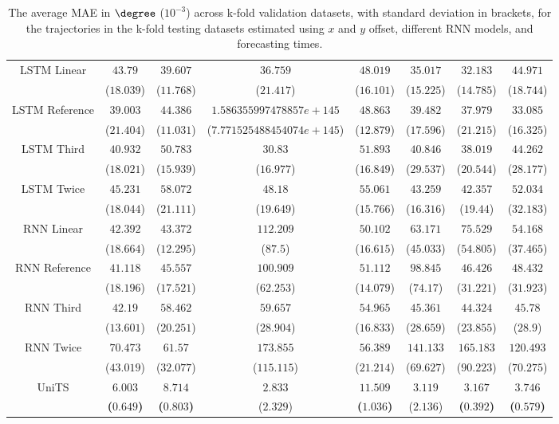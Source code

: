 \begin{table}[!ht]
{\begin{tabular}{|c|c|c|c|c|c|c|c|}
			\multirow{2}{*}{LSTM Linear} & $43.79$ & $39.607$ & $36.759$ & $48.019$ & $35.017$ & $32.183$ & $44.971$ \\
			 & ($18.039$) & ($11.768$) & ($21.417$) & ($16.101$) & ($15.225$) & ($14.785$) & ($18.744$) \\ \hline
			\multirow{2}{*}{LSTM Reference} & $39.003$ & $44.386$ & $1.586355997478857e+145$ & $48.863$ & $39.482$ & $37.979$ & $33.085$ \\
			 & ($21.404$) & ($11.031$) & ($7.771525488454074e+145$) & ($12.879$) & ($17.596$) & ($21.215$) & ($16.325$) \\ \hline
			\multirow{2}{*}{LSTM Third} & $40.932$ & $50.783$ & $30.83$ & $51.893$ & $40.846$ & $38.019$ & $44.262$ \\
			 & ($18.021$) & ($15.939$) & ($16.977$) & ($16.849$) & ($29.537$) & ($20.544$) & ($28.177$) \\ \hline
			\multirow{2}{*}{LSTM Twice} & $45.231$ & $58.072$ & $48.18$ & $55.061$ & $43.259$ & $42.357$ & $52.034$ \\
			 & ($18.044$) & ($21.111$) & ($19.649$) & ($15.766$) & ($16.316$) & ($19.44$) & ($32.183$) \\ \hline
			\multirow{2}{*}{RNN Linear} & $42.392$ & $43.372$ & $112.209$ & $50.102$ & $63.171$ & $75.529$ & $54.168$ \\
			 & ($18.664$) & ($12.295$) & ($87.5$) & ($16.615$) & ($45.033$) & ($54.805$) & ($37.465$) \\ \hline
			\multirow{2}{*}{RNN Reference} & $41.118$ & $45.557$ & $100.909$ & $51.112$ & $98.845$ & $46.426$ & $48.432$ \\
			 & ($18.196$) & ($17.521$) & ($62.253$) & ($14.079$) & ($74.17$) & ($31.221$) & ($31.923$) \\ \hline
			\multirow{2}{*}{RNN Third} & $42.19$ & $58.462$ & $59.657$ & $54.965$ & $45.361$ & $44.324$ & $45.78$ \\
			 & ($13.601$) & ($20.251$) & ($28.904$) & ($16.833$) & ($28.659$) & ($23.855$) & ($28.9$) \\ \hline
			\multirow{2}{*}{RNN Twice} & $70.473$ & $61.57$ & $173.855$ & $56.389$ & $141.133$ & $165.183$ & $120.493$ \\
			 & ($43.019$) & ($32.077$) & ($115.115$) & ($21.214$) & ($69.627$) & ($90.223$) & ($70.275$) \\ \hline
			\multirow{2}{*}{UniTS} & $\mathbf{6.003}$ & $\mathbf{8.714}$ & $2.833$ & $\mathbf{11.509}$ & $3.119$ & $\mathbf{3.167}$ & $\mathbf{3.746}$ \\
			 & \textbf{(}$\mathbf{0.649}$\textbf{)} & \textbf{(}$\mathbf{0.803}$\textbf{)} & ($2.329$) & \textbf{(}$\mathbf{1.036}$\textbf{)} & ($2.136$) & \textbf{(}$\mathbf{0.392}$\textbf{)} & \textbf{(}$\mathbf{0.579}$\textbf{)} \\ \hline
		\end{tabular}
	}
	\caption{The average MAE in $\degree$ ($10^{-3}$) across k-fold validation datasets, with standard deviation in brackets, for the trajectories in the k-fold testing datasets estimated using $x$ and $y$ offset, different RNN models, and forecasting times.}
	\label{tab:all_no_abs_MAE}
\end{table}

